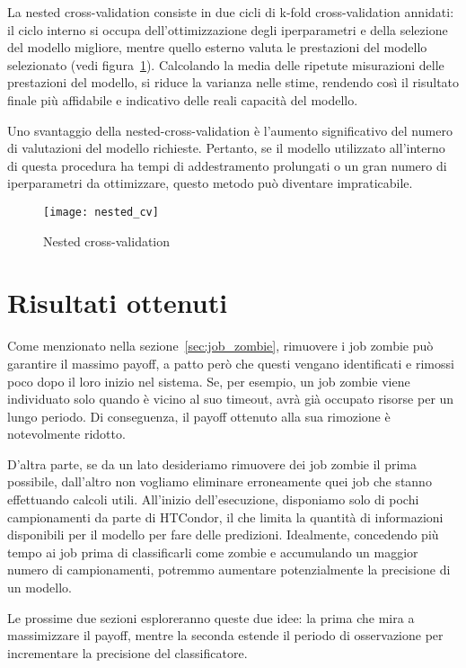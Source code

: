 La nested cross-validation consiste in due cicli di k-fold cross-validation
annidati: il ciclo interno si occupa dell'ottimizzazione degli iperparametri e
della selezione del modello migliore, mentre quello esterno valuta le
prestazioni del modello selezionato (vedi figura~\ref{fig:nested_cv}).
Calcolando la media delle ripetute misurazioni delle prestazioni del modello,
si riduce la varianza nelle stime, rendendo così il risultato finale più
affidabile e indicativo delle reali capacità del modello.

Uno svantaggio della nested-cross-validation è l'aumento significativo del
numero di valutazioni del modello richieste. Pertanto, se il modello
utilizzato all'interno di questa procedura ha tempi di addestramento
prolungati o un gran numero di iperparametri da ottimizzare, questo metodo può
diventare impraticabile.

\begin{figure}[!ht]
    \centering
    \texttt{[image: nested\_cv]}
    \caption{Nested cross-validation \protect\cite{raschka2018}}
    \label{fig:nested_cv}
\end{figure}

\section{Risultati ottenuti}

Come menzionato nella sezione~\ref{sec:job_zombie}, rimuovere i job zombie può
garantire il massimo payoff, a patto però che questi vengano identificati e
rimossi poco dopo il loro inizio nel sistema. Se, per esempio, un job zombie
viene individuato solo quando è vicino al suo timeout, avrà già occupato
risorse per un lungo periodo. Di conseguenza, il payoff ottenuto alla sua
rimozione è notevolmente ridotto.

D'altra parte, se da un lato desideriamo rimuovere dei job zombie il prima
possibile, dall'altro non vogliamo eliminare erroneamente quei job che stanno
effettuando calcoli utili. All'inizio dell'esecuzione, disponiamo solo di
pochi campionamenti da parte di HTCondor, il che limita la quantità di
informazioni disponibili per il modello per fare delle predizioni. Idealmente,
concedendo più tempo ai job prima di classificarli come zombie e accumulando
un maggior numero di campionamenti, potremmo aumentare potenzialmente la
precisione di un modello.

Le prossime due sezioni esploreranno queste due idee: la prima che mira a
massimizzare il payoff, mentre la seconda estende il periodo di osservazione
per incrementare la precisione del classificatore.

